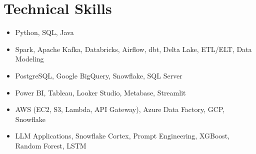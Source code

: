 \documentclass[letterpaper,11pt]{article}
\newcommand{\resumeItem}[2]{
  \item{
    \textbf{#1}{: #2 \vspace{-2pt}}
  }
}
\newcommand{\resumeSubHeadingListStart}{\begin{itemize}[leftmargin=0pt,label={},itemsep=-2pt]}
\newcommand{\resumeSubHeadingListEnd}{\end{itemize}}
\renewcommand{\resumeItem}[2]{
  \item {#2}
}
\begin{document}
\section{Technical Skills}
 \resumeSubHeadingListStart
   \resumeItem{Programming Languages}{Python, SQL, Java}
   \resumeItem{Data Engineering}{Spark, Apache Kafka, Databricks, Airflow, dbt, Delta Lake, ETL/ELT, Data Modeling}
   \resumeItem{Databases \& Warehouses}{PostgreSQL, Google BigQuery, Snowflake, SQL Server}
   \resumeItem{Analytics \& Visualization}{Power BI, Tableau, Looker Studio, Metabase, Streamlit}
   \resumeItem{Cloud \& Infrastructure}{AWS (EC2, S3, Lambda, API Gateway), Azure Data Factory, GCP, Snowflake}
   \resumeItem{AI \& Machine Learning}{LLM Applications, Snowflake Cortex, Prompt Engineering, XGBoost, Random Forest, LSTM}
 \resumeSubHeadingListEnd

\end{document}

